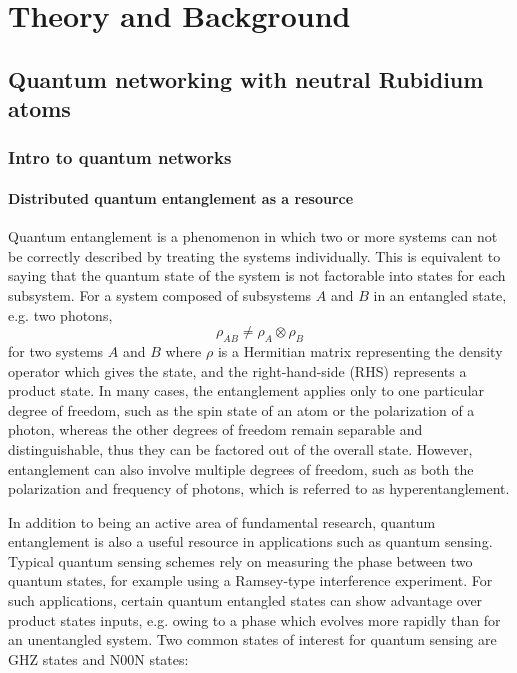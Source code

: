 \part{Theory and Background}\label{part:theory}
\chapter{Quantum networking with neutral Rubidium atoms}\label{ch:intro_to_qn}



\section{Intro to quantum networks}
\subsection{Distributed quantum entanglement as a resource}
Quantum entanglement is a phenomenon in which two or more systems can not be correctly described by treating the systems individually. This is equivalent to saying that the quantum state of the system is not factorable into states for each subsystem. For a system composed of subsystems $A$ and $B$ in an entangled state, e.g. two photons,
\begin{equation}
    \rho_{AB} \neq \rho_A \otimes \rho_B
\end{equation}
for two systems $A$ and $B$ where $\rho$ is a Hermitian matrix representing the density operator which gives the state, and the right-hand-side (RHS) represents a product state.
In many cases, the entanglement applies only to one particular degree of freedom, such as the spin state of an atom or the polarization of a photon, whereas the other degrees of freedom remain separable and distinguishable, thus they can be factored out of the overall state. However, entanglement can also involve multiple degrees of freedom, such as both the polarization and frequency of photons, which is referred to as hyperentanglement.

In addition to being an active area of fundamental research, quantum entanglement is also a useful resource in applications such as quantum sensing. Typical quantum sensing schemes rely on measuring the phase between two quantum states, for example using a Ramsey-type interference experiment. For such applications, certain quantum entangled states can show advantage over product states inputs, e.g. owing to a phase which evolves more rapidly than for an unentangled system. Two common states of interest for quantum sensing are GHZ states and N00N states:

